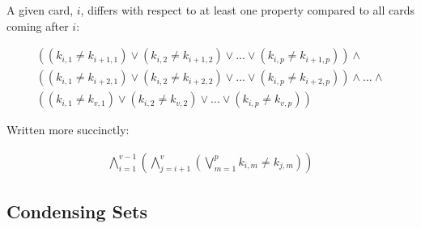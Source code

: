 \documentclass[pageno]{jpaper}
\begin{document}

A given card, $i$, differs with respect to at least one property compared to all cards coming after $i:$

\begin{multline}
	((k_{i,1} \neq k_{i+1,1}) \vee (k_{i,2} \neq k_{i+1,2}) \vee ... \vee (k_{i,p} \neq k_{i+1,p}))  \wedge \\
	((k_{i,1} \neq k_{i+2,1}) \vee (k_{i,2} \neq k_{i+2,2}) \vee ... \vee (k_{i,p} \neq k_{i+2,p}))  \wedge ... \wedge \\ 
	((k_{i,1} \neq k_{v,1}) \vee (k_{i,2} \neq k_{v,2}) \vee ... \vee (k_{i,p} \neq k_{v,p})) 
\end{multline}

Written more succinctly:





\begin{align}
	\bigwedge \limits_{i=1}^{v-1}   \left( \bigwedge \limits_{j=i+1}^{v}   \left( \bigvee \limits_{m = 1}^{p} k_{i,m} \neq k_{j,m} \right)  \right)
\end{align}

\subsection {Condensing Sets}
\end{document}
